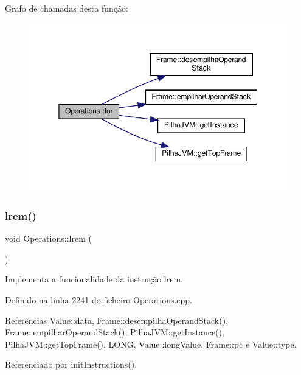 Grafo de chamadas desta função\+:\nopagebreak
\begin{figure}[H]
\begin{center}
\leavevmode
\includegraphics[width=345pt]{classOperations_a89193dfaaa2c4c45f320c6b9f0b5601c_cgraph}
\end{center}
\end{figure}
\mbox{\label{classOperations_a437e4b34f2f1be8982d36f0cdf47f98c}} 
\subsubsection{\texorpdfstring{lrem()}{lrem()}}
{\footnotesize\ttfamily void Operations\+::lrem (\begin{DoxyParamCaption}{ }\end{DoxyParamCaption})\hspace{0.3cm}{\ttfamily [private]}}



Implementa a funcionalidade da instrução lrem. 



Definido na linha 2241 do ficheiro Operations.\+cpp.



Referências Value\+::data, Frame\+::desempilha\+Operand\+Stack(), Frame\+::empilhar\+Operand\+Stack(), Pilha\+J\+V\+M\+::get\+Instance(), Pilha\+J\+V\+M\+::get\+Top\+Frame(), L\+O\+NG, Value\+::long\+Value, Frame\+::pc e Value\+::type.



Referenciado por init\+Instructions().

